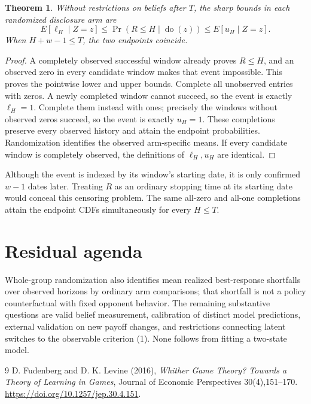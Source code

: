 \documentclass[11pt]{article}
\newtheorem{theorem}{Theorem}
\theoremstyle{definition}
\begin{document}
\begin{theorem}
Without restrictions on beliefs after $T$, the sharp bounds in each
randomized disclosure arm are
\[
 E[\ell_H\mid Z=z]\le
 \Pr(R\le H\mid\operatorname{do}(z))
 \le E[u_H\mid Z=z].                                   \tag{6}
\]
When $H+w-1\le T$, the two endpoints coincide.
\end{theorem}
\begin{proof}
A completely observed successful window already proves $R\le H$,
and an observed zero in every candidate window makes that event
impossible. This proves the pointwise lower and upper bounds. Complete
all unobserved entries with zeros. A newly completed window cannot
succeed, so the event is exactly $\ell_H=1$. Complete them instead
with ones; precisely the windows without observed zeros succeed, so
the event is exactly $u_H=1$. These completions preserve every observed
history and attain the endpoint probabilities. Randomization identifies
the observed arm-specific means. If every candidate window is completely
observed, the definitions of $\ell_H,u_H$ are identical.
\end{proof}
Although the event is indexed by its window's starting date, it is only
confirmed $w-1$ dates later. Treating $R$ as an ordinary stopping time
at its starting date would conceal this censoring problem. The same
all-zero and all-one completions attain the endpoint CDFs simultaneously
for every $H\le T$.

\section*{Residual agenda}
Whole-group randomization also identifies mean realized best-response
shortfalls over observed horizons by ordinary arm comparisons; that
shortfall is not a policy counterfactual with fixed opponent behavior.
The remaining substantive questions are valid belief measurement,
calibration of distinct model predictions, external validation on new
payoff changes, and restrictions connecting latent switches to the
observable criterion (1). None follows from fitting a two-state model.
\begin{thebibliography}{9}
 D. Fudenberg and D. K. Levine (2016), \emph{Whither Game
Theory? Towards a Theory of Learning in Games}, Journal of Economic
Perspectives 30(4),151--170.
\url{https://doi.org/10.1257/jep.30.4.151}.
\end{thebibliography}
\end{document}
